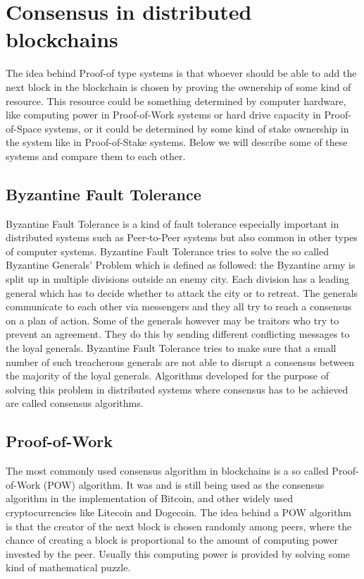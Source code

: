 \section{Consensus in distributed blockchains}

The idea behind Proof-of type systems is that whoever should be able to add the next block in the blockchain is chosen by proving the ownership of some kind of resource. This resource could be
something determined by computer hardware, like computing power in Proof-of-Work systems or hard drive capacity in Proof-of-Space systems, or it could be determined by some kind of stake ownership
in the system like in Proof-of-Stake systems. Below we will describe some of these systems and compare them to each other.

\subsection{Byzantine Fault Tolerance}

Byzantine Fault Tolerance is a kind of fault tolerance especially important in distributed systems such as Peer-to-Peer systems but also common in other types of computer systems.
Byzantine Fault Tolerance tries to solve the so called Byzantine Generals' Problem which is defined as followed: the Byzantine army is split up in multiple divisions 
outside an enemy city. Each division has a leading general which has to decide whether to attack the city or to retreat. The generals communicate to each other via messengers and they all try to
reach a consensus on a plan of action. Some of the generals however may be traitors who try to prevent an agreement. They do this by sending different conflicting messages to the loyal generals. 
Byzantine Fault Tolerance tries to make sure that a small number of such treacherous generals are not able to disrupt a consensus between the majority of the loyal generals.\cite{url:byzantine_general}
Algorithms developed for the purpose of solving this problem in distributed systems where consensus has to be achieved are called consensus algorithms.

\subsection{Proof-of-Work}

The most commonly used consensus algorithm in blockchains is a so called Proof-of-Work (POW) algorithm. It was and is still being used as the consensus algorithm in the implementation of Bitcoin,\cite{url:bitcoin}
and other widely used cryptocurrencies like Litecoin and Dogecoin.
The idea behind a POW algorithm is that the creator of the next block is chosen randomly among peers, where the chance of creating a block is proportional to the amount of computing power invested
by the peer. Usually this computing power is provided by solving some kind of mathematical puzzle.

